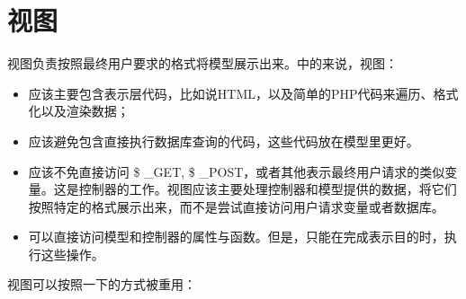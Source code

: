 \section{视图}


视图负责按照最终用户要求的格式将模型展示出来。中的来说，视图：

\begin{itemize}

\item 应该主要包含表示层代码，比如说HTML，以及简单的PHP代码来遍历、格式化以及渲染数据；
\item 应该避免包含直接执行数据库查询的代码，这些代码放在模型里更好。
\item 应该不免直接访问 \$ \_GET, \$ \_POST，或者其他表示最终用户请求的类似变量。这是控制器的工作。视图应该主要处理控制器和模型提供的数据，将它们按照特定的格式展示出来，而不是尝试直接访问用户请求变量或者数据库。
\item 可以直接访问模型和控制器的属性与函数。但是，只能在完成表示目的时，执行这些操作。
\end{itemize}


视图可以按照一下的方式被重用：

